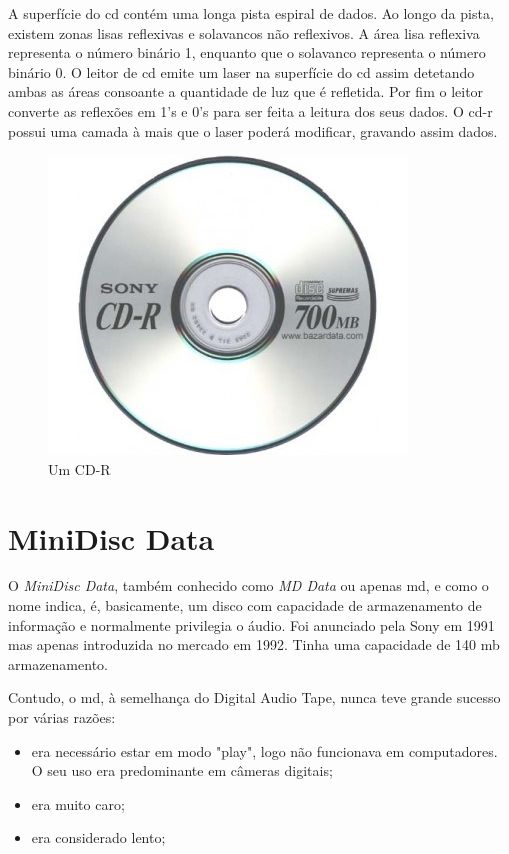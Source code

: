 \documentclass{report}
\begin{document}
	A superfície do \ac{cd} contém uma longa pista espiral de dados. Ao longo da pista, existem zonas lisas reflexivas e solavancos não reflexivos. A área lisa reflexiva representa o número binário 1, enquanto que o solavanco representa o número binário 0. O leitor de \ac{cd} emite um laser na superfície do \ac{cd} assim detetando ambas as áreas consoante a quantidade de luz que é refletida. Por fim o leitor converte as reflexões em 1's e 0's para ser feita a leitura dos seus dados. O \ac{cd-r} possui uma camada à mais que o laser poderá modificar, gravando assim dados.
\vspace{1mm}

	\begin{figure} [h]
		\centering
		\includegraphics[scale=0.4]{cd-r.jpg}
		\caption{Um CD-R}
	\end{figure}

\newpage

		\section{MiniDisc Data}
		O 	\textit{MiniDisc Data}, também conhecido como \textit{MD Data} ou apenas \ac{md}, e como o nome indica, é, basicamente, um disco com capacidade de armazenamento de informação e normalmente privilegia o áudio. Foi anunciado pela Sony em 1991 mas apenas introduzida no mercado em 1992. 
Tinha uma capacidade de 140 \ac{mb} armazenamento.

	Contudo, o \ac{md}, à semelhança do Digital Audio Tape, nunca teve grande sucesso por várias razões:
	\begin{itemize} 
		\item era necessário estar em modo "play", logo não funcionava em computadores. O seu uso era predominante em câmeras digitais; 
		\item era muito caro;
		\item era considerado lento;
	\end{itemize} 
	
\end{document}

